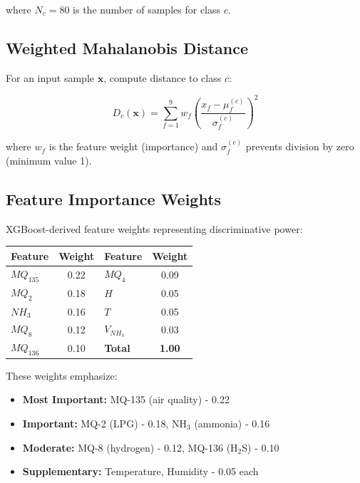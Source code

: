 \documentclass[10pt]{article}
\begin{document}
where $N_c = 80$ is the number of samples for class $c$.

\subsection{Weighted Mahalanobis Distance}

For an input sample $\mathbf{x}$, compute distance to class $c$:

\begin{equation}
D_c(\mathbf{x}) = \sum_{f=1}^{9} w_f \left(\frac{x_f - \mu_f^{(c)}}{\sigma_f^{(c)}}\right)^2
\end{equation}

where $w_f$ is the feature weight (importance) and $\sigma_f^{(c)}$ prevents division by zero (minimum value 1).

\subsection{Feature Importance Weights}

XGBoost-derived feature weights representing discriminative power:

\begin{table}[ht]
\centering
\begin{tabular}{|l|c|l|c|}
\hline
\textbf{Feature} & \textbf{Weight} & \textbf{Feature} & \textbf{Weight} \\
\hline
$MQ_{135}$ & 0.22 & $MQ_4$ & 0.09 \\
$MQ_2$ & 0.18 & $H$ & 0.05 \\
$NH_3$ & 0.16 & $T$ & 0.05 \\
$MQ_8$ & 0.12 & $V_{NH_3}$ & 0.03 \\
$MQ_{136}$ & 0.10 & \textbf{Total} & \textbf{1.00} \\
\hline
\end{tabular}
\end{table}

These weights emphasize:
\begin{itemize}
    \item \textbf{Most Important:} MQ-135 (air quality) - 0.22
    \item \textbf{Important:} MQ-2 (LPG) - 0.18, NH$_3$ (ammonia) - 0.16
    \item \textbf{Moderate:} MQ-8 (hydrogen) - 0.12, MQ-136 (H$_2$S) - 0.10
    \item \textbf{Supplementary:} Temperature, Humidity - 0.05 each
\end{itemize}
\end{document}

